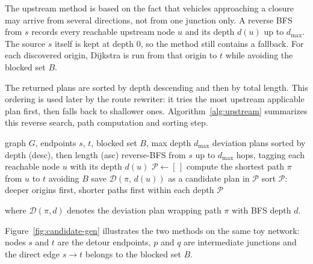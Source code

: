 The upstream method is based on the fact that vehicles approaching a closure
may arrive from several directions, not from one junction only. A reverse BFS
from $s$ records every reachable upstream node $u$ and its depth $d(u)$ up to
$d_{\max}$. The source $s$ itself is kept at depth $0$, so the method still
contains a fallback. For each discovered origin, Dijkstra is run
from that origin to $t$ while avoiding the blocked set $B$.

The returned plans are sorted by depth descending and then by total length.
This ordering is used later by the route rewriter: it tries the most upstream
applicable plan first, then falls back to shallower ones.
Algorithm~\ref{alg:upstream} summarizes this reverse search, path computation
and sorting step.

\begin{algorithm}[H]
\caption{High-level pseudocode for \textsc{UpstreamDeviationPlans}, which
searches upstream origins and sorts feasible detours by depth and length.}\label{alg:upstream}
\begin{algorithmic}[1]
\Require graph $G$, endpoints $s$, $t$, blocked set $B$, max depth $d_{\max}$
\Ensure deviation plans sorted by depth (desc), then length (asc)
\State reverse-BFS from $s$ up to $d_{\max}$ hops, tagging each reachable node $u$ with its depth $d(u)$
\State $\mathcal{P} \leftarrow [\,]$
  \State compute the shortest path $\pi$ from $u$ to $t$ avoiding $B$
    \State save $\mathcal{D}(\pi,\, d(u))$ as a candidate plan in $\mathcal{P}$
  \EndIf
\EndFor
\State sort $\mathcal{P}$: deeper origins first, shorter paths first within each depth
\State \Return $\mathcal{P}$
\end{algorithmic}
\end{algorithm}

\noindent where $\mathcal{D}(\pi, d)$ denotes the deviation plan wrapping
path $\pi$ with BFS depth $d$.

Figure~\ref{fig:candidate-gen} illustrates the two methods on the same toy
network: nodes $s$ and $t$ are the detour endpoints, $p$ and $q$ are
intermediate junctions and the direct edge $s\to t$ belongs to the blocked
set $B$.


